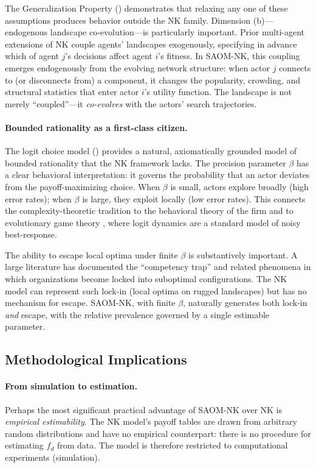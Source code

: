 \documentclass[12pt]{article}
\begin{document}
The Generalization Property () demonstrates that
relaxing any one of these assumptions produces behavior outside the NK family.
Dimension (b)---endogenous landscape co-evolution---is particularly important.
Prior multi-agent extensions of NK \citep{siggelkow2005speed, rivkin2007balancing}
couple agents' landscapes exogenously, specifying in advance which of agent
$j$'s decisions affect agent $i$'s fitness. In SAOM-NK, this coupling emerges
endogenously from the evolving network structure: when actor $j$ connects to
(or disconnects from) a component, it changes the popularity, crowding, and
structural statistics that enter actor $i$'s utility function. The landscape
is not merely ``coupled''---it \emph{co-evolves} with the actors' search
trajectories.

\paragraph{Bounded rationality as a first-class citizen.}
The logit choice model () provides a natural,
axiomatically grounded model of bounded rationality that the NK framework
lacks. The precision parameter $\beta$ has a clear behavioral interpretation:
it governs the probability that an actor deviates from the payoff-maximizing
choice. When $\beta$ is small, actors explore broadly (high error rates);
when $\beta$ is large, they exploit locally (low error rates). This connects
the complexity-theoretic tradition to the behavioral theory of the firm and
to evolutionary game theory \citep{blume1993statistical}, where logit dynamics
are a standard model of noisy best-response.

The ability to escape local optima under finite $\beta$ is substantively
important. A large literature has documented the ``competency trap'' and
related phenomena in which organizations become locked into suboptimal
configurations. The NK model can represent such lock-in (local optima on
rugged landscapes) but has no mechanism for escape. SAOM-NK, with finite
$\beta$, naturally generates both lock-in \emph{and} escape, with the
relative prevalence governed by a single estimable parameter.

\subsection{Methodological Implications}

\paragraph{From simulation to estimation.}
Perhaps the most significant practical advantage of SAOM-NK over NK is
\emph{empirical estimability}. The NK model's payoff tables are drawn from
arbitrary random distributions and have no empirical counterpart: there is
no procedure for estimating $f_d$ from data. The model is therefore
restricted to computational experiments (simulation).
\end{document}
